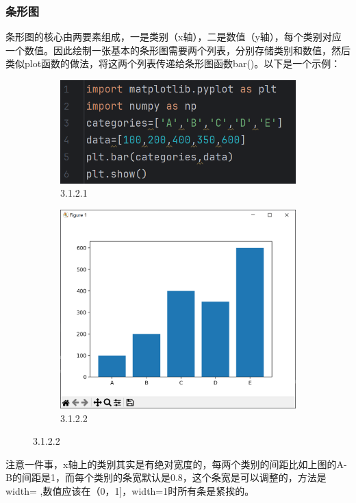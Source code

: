 \documentclass[12pt]{article}
\begin{document}
\subsubsection{条形图}
条形图的核心由两要素组成，一是类别（x轴），二是数值（y轴），每个类别对应一个数值。因此绘制一张基本的条形图需要两个列表，分别存储类别和数值，然后类似plot函数的做法，将这两个列表传递给条形图函数bar()。以下是一个示例：
\begin{figure}[H]
    \centering
    \begin{subfigure}[b]{0.5\textwidth}
        \includegraphics[width=\textwidth]{条形图 program1.png} %
        \caption{3.1.2.1}
        \label{fig:line-graph2}
    \end{subfigure}
    \hfill
    \begin{subfigure}[b]{0.45\textwidth}
        \includegraphics[width=\textwidth]{条形图 Pic1.png} %
        \caption{3.1.2.2}
        \label{fig:line-graph2-pic2}
    \end{subfigure}
\end{figure}
\noindent 注意一件事，x轴上的类别其实是有绝对宽度的，每两个类别的间距比如上图的A-B的间距是1，而每个类别的条宽默认是0.8，这个条宽是可以调整的，方法是width= ,数值应该在（0，1]，width=1时所有条是紧挨的。
\end{document}
